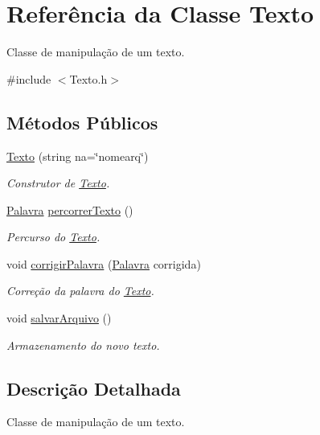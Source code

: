 \hypertarget{classTexto}{}\section{Referência da Classe Texto}
\label{classTexto}


Classe de manipulação de um texto.  




{\ttfamily \#include $<$Texto.\+h$>$}

\subsection*{Métodos Públicos}
\begin{DoxyCompactItemize}
\item 
\hyperlink{classTexto_a994cfaf08f49b74b55c2ff8e637a496c}{Texto} (string na=\char`\"{}nomearq\char`\"{})
\begin{DoxyCompactList}\small\item\em Construtor de \hyperlink{classTexto}{Texto}. \end{DoxyCompactList}\item 
\hyperlink{classPalavra}{Palavra} \hyperlink{classTexto_ad5a75aaf1bd72a2ed320cd88f5855fa1}{percorrer\+Texto} ()
\begin{DoxyCompactList}\small\item\em Percurso do \hyperlink{classTexto}{Texto}. \end{DoxyCompactList}\item 
void \hyperlink{classTexto_a22a609901801895bd761ea85f0111b19}{corrigir\+Palavra} (\hyperlink{classPalavra}{Palavra} corrigida)
\begin{DoxyCompactList}\small\item\em Correção da palavra do \hyperlink{classTexto}{Texto}. \end{DoxyCompactList}\item 
void \hyperlink{classTexto_aa637986e50d826319f321167dfaf2d9c}{salvar\+Arquivo} ()
\begin{DoxyCompactList}\small\item\em Armazenamento do novo texto. \end{DoxyCompactList}\end{DoxyCompactItemize}


\subsection{Descrição Detalhada}
Classe de manipulação de um texto. 

